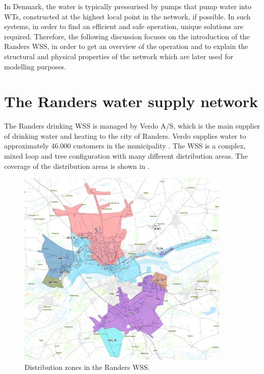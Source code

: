 In Denmark, the water is typically pressurised by pumps that pump water into WTs, constructed at the highest local point in the network, if possible. In such systems, in order to find an efficient and safe operation, unique solutions are required. Therefore, the following discussion focuses on the introduction of the Randers WSS, in order to get an overview of the operation and to explain the structural and physical properties of the network which are later used for modelling purposes. 

\newpage

\section{The Randers water supply network}
\label{the_randers_water_supply_network}

The Randers drinking WSS is managed by Verdo A/S, which is the main supplier of drinking water and heating to the city of Randers. Verdo supplies water to approximately 46.000 customers in the municipality \cite{verdo}. The WSS is a complex, mixed loop and tree configuration with many different distribution areas. The coverage of the distribution areas is shown in .

\begin{figure}[H]
\centering
\includegraphics[width=0.9\textwidth]{report/pictures/level_zones}
\caption{Distribution zones in the Randers WSS.}
\label{fig:level_zones}
\end{figure}

